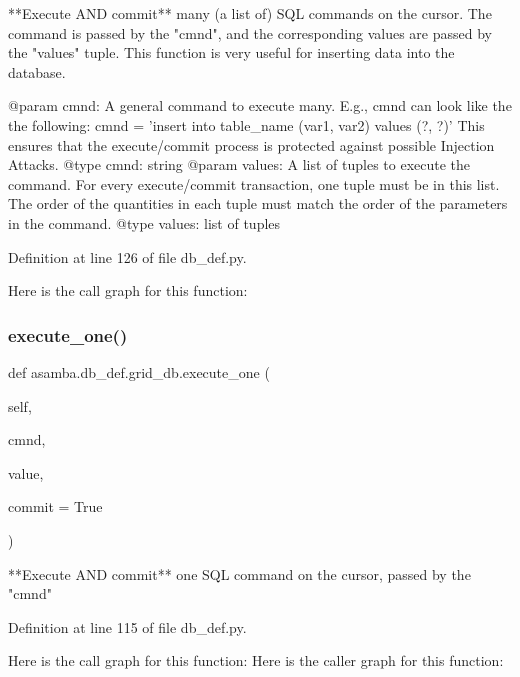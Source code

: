 \begin{DoxyVerb}**Execute AND commit** many (a list of) SQL commands on the cursor.
The command is passed by the "cmnd", and the corresponding values are passed
by the "values" tuple. This function is very useful for inserting data into
the database.

@param cmnd: A general command to execute many. E.g., cmnd can look like the 
   the following: cmnd = 'insert into table_name (var1, var2) values (?, ?)'
   This ensures that the execute/commit process is protected against possible
   Injection Attacks. 
@type cmnd: string
@param values: A list of tuples to execute the command. For every execute/commit
  transaction, one tuple must be in this list. The order of the quantities 
  in each tuple must match the order of the parameters in the command.
@type values: list of tuples
\end{DoxyVerb}
 

Definition at line 126 of file db\+\_\+def.\+py.

Here is the call graph for this function\+:
\mbox{\label{classasamba_1_1db__def_1_1grid__db_a818c15b631b12709a243334f8757066c}} 
\subsubsection{\texorpdfstring{execute\+\_\+one()}{execute\_one()}}
{\footnotesize\ttfamily def asamba.\+db\+\_\+def.\+grid\+\_\+db.\+execute\+\_\+one (\begin{DoxyParamCaption}\item[{}]{self,  }\item[{}]{cmnd,  }\item[{}]{value,  }\item[{}]{commit = {\ttfamily True} }\end{DoxyParamCaption})}

\begin{DoxyVerb}**Execute AND commit** one SQL command on the cursor, passed by the "cmnd"
\end{DoxyVerb}
 

Definition at line 115 of file db\+\_\+def.\+py.

Here is the call graph for this function\+:
Here is the caller graph for this function\+:
\mbox{\label{classasamba_1_1db__def_1_1grid__db_aff28a89e835e0a22e3a7c2593a165179}} 
